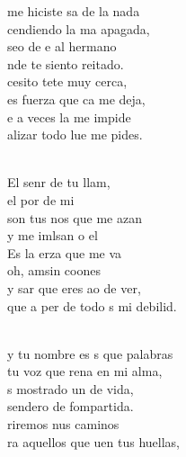 \documentclass[12pt]{article}
\begin{document}
\begin{multicols*}{2}
\begin{cancion}%
	 me hiciste sa de la nada \\
	cendiendo la ma apagada,\\
	seo de e al hermano\\
	nde te siento reitado.\\
	cesito tete muy cerca,\\
	es fuerza que ca me deja,\\
	e a veces la  me impide\\
	alizar todo lue me pides.\\\jump\\
	\begin{chorus}%
	El senr de tu llam,\\
	el por de mi\\
	son tus nos que me azan\\
	y me imlsan o el \\
	Es la erza que me va\\
	oh,  amsin coones\\
	y sar que eres ao de ver,\\
	que a per de todo s mi debilid.\\
	\end{chorus}%
	\jump\\
	y tu nombre es s que palabras\\
	 tu voz que rena en mi alma,\\
	s mostrado un  de vida,\\
	 sendero de fompartida.\\
	riremos nus caminos \\
	ra aquellos que uen tus huellas,\\

\end{cancion}
\end{multicols*}
\end{document}
